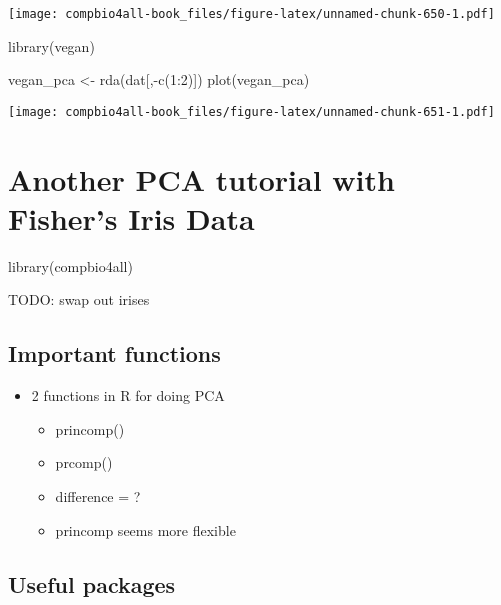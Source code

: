 \documentclass[
]{book}
\newenvironment{Shaded}{\begin{snugshade}}{\end{snugshade}}
\newcommand{\DecValTok}[1]{\textcolor[rgb]{0.00,0.00,0.81}{#1}}
\newcommand{\FunctionTok}[1]{\textcolor[rgb]{0.00,0.00,0.00}{#1}}
\newcommand{\NormalTok}[1]{#1}
\newcommand{\OtherTok}[1]{\textcolor[rgb]{0.56,0.35,0.01}{#1}}
\newcommand{\SpecialCharTok}[1]{\textcolor[rgb]{0.00,0.00,0.00}{#1}}
\providecommand{\tightlist}{%
  \setlength{\itemsep}{0pt}\setlength{\parskip}{0pt}}
\begin{document}
\texttt{[image: compbio4all-book\_files/figure-latex/unnamed-chunk-650-1.pdf]}

\begin{Shaded}
\begin{Highlighting}[]
\FunctionTok{library}\NormalTok{(vegan)}

\NormalTok{vegan\_pca }\OtherTok{\textless{}{-}} \FunctionTok{rda}\NormalTok{(dat[,}\SpecialCharTok{{-}}\FunctionTok{c}\NormalTok{(}\DecValTok{1}\SpecialCharTok{:}\DecValTok{2}\NormalTok{)])}
\FunctionTok{plot}\NormalTok{(vegan\_pca)}
\end{Highlighting}
\end{Shaded}

\texttt{[image: compbio4all-book\_files/figure-latex/unnamed-chunk-651-1.pdf]}

\hypertarget{another-pca-tutorial-with-fishers-iris-data}{%
\chapter{Another PCA tutorial with Fisher's Iris Data}\label{another-pca-tutorial-with-fishers-iris-data}}

\begin{Shaded}
\begin{Highlighting}[]
\FunctionTok{library}\NormalTok{(compbio4all)}
\end{Highlighting}
\end{Shaded}

TODO: swap out irises

\hypertarget{important-functions}{%
\section{Important functions}\label{important-functions}}

\begin{itemize}
\tightlist
\item
  2 functions in R for doing PCA

  \begin{itemize}
  \tightlist
  \item
    princomp()
  \item
    prcomp()
  \item
    difference = ?
  \item
    princomp seems more flexible
  \end{itemize}
\end{itemize}

\hypertarget{useful-packages}{%
\section{Useful packages}\label{useful-packages}}
\end{document}
